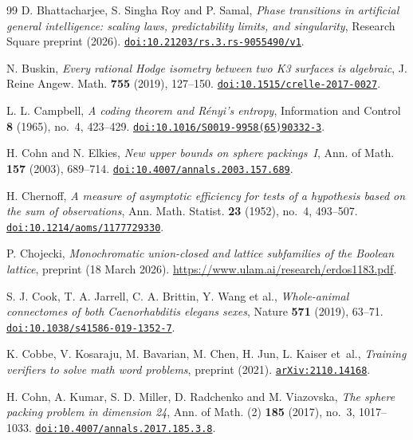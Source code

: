 \begin{thebibliography}{99}
D. Bhattacharjee, S. Singha Roy and P. Samal,
\emph{Phase transitions in artificial general intelligence: scaling laws, predictability limits, and singularity},
Research Square preprint (2026).
\href{https://doi.org/10.21203/rs.3.rs-9055490/v1}{\nolinkurl{doi:10.21203/rs.3.rs-9055490/v1}}.

N. Buskin,
\emph{Every rational Hodge isometry between two K3 surfaces is algebraic},
J. Reine Angew. Math. \textbf{755} (2019), 127--150.
\href{https://doi.org/10.1515/crelle-2017-0027}{\nolinkurl{doi:10.1515/crelle-2017-0027}}.

L. L. Campbell,
\emph{A coding theorem and R\'enyi's entropy},
Information and Control \textbf{8} (1965), no.~4, 423--429.
\href{https://doi.org/10.1016/S0019-9958(65)90332-3}{\nolinkurl{doi:10.1016/S0019-9958(65)90332-3}}.

H. Cohn and N. Elkies,
\emph{New upper bounds on sphere packings~I},
Ann. of Math. \textbf{157} (2003), 689--714.
\href{https://doi.org/10.4007/annals.2003.157.689}{\nolinkurl{doi:10.4007/annals.2003.157.689}}.

H. Chernoff,
\emph{A measure of asymptotic efficiency for tests of a hypothesis based on the sum of observations},
Ann. Math. Statist. \textbf{23} (1952), no.~4, 493--507.
\href{https://doi.org/10.1214/aoms/1177729330}{\nolinkurl{doi:10.1214/aoms/1177729330}}.

P. Chojecki,
\emph{Monochromatic union-closed and lattice subfamilies of the Boolean lattice},
preprint (18 March 2026).
\url{https://www.ulam.ai/research/erdos1183.pdf}.

S. J. Cook, T. A. Jarrell, C. A. Brittin, Y. Wang et al.,
\emph{Whole-animal connectomes of both Caenorhabditis elegans sexes},
Nature \textbf{571} (2019), 63--71.
\href{https://doi.org/10.1038/s41586-019-1352-7}{\nolinkurl{doi:10.1038/s41586-019-1352-7}}.

K. Cobbe, V. Kosaraju, M. Bavarian, M. Chen, H. Jun, L. Kaiser et~al.,
\emph{Training verifiers to solve math word problems},
preprint (2021).
\href{https://arxiv.org/abs/2110.14168}{\nolinkurl{arXiv:2110.14168}}.

H. Cohn, A. Kumar, S. D. Miller, D. Radchenko and M. Viazovska,
\emph{The sphere packing problem in dimension 24},
Ann. of Math. (2) \textbf{185} (2017), no.~3, 1017--1033.
\href{https://doi.org/10.4007/annals.2017.185.3.8}{\nolinkurl{doi:10.4007/annals.2017.185.3.8}}.


\end{thebibliography}
